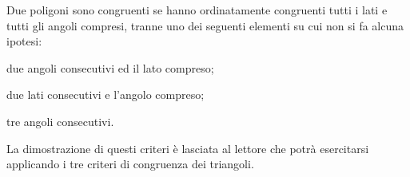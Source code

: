 \begin{teorema}
Due poligoni sono congruenti se hanno ordinatamente congruenti tutti i lati e tutti gli angoli compresi, tranne uno dei seguenti elementi su cui non si fa alcuna ipotesi:
\begin{itemize*}
\item due angoli consecutivi ed il lato compreso;
\item due lati consecutivi e l'angolo compreso;
\item tre angoli consecutivi.
\end{itemize*}
\end{teorema}

La dimostrazione di questi criteri è lasciata al lettore che potrà esercitarsi applicando i tre criteri di congruenza dei triangoli.


\newpage



\cleardoublepage
